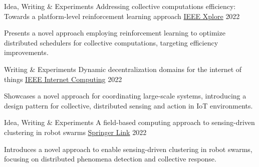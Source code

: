 \begin{cventries}
  \cventry
    {Idea, Writing \& Experiments}
    {Addressing collective computations efficiency: Towards a platform-level reinforcement learning approach} %
    {\href{https://doi.org/10.1109/ACSOS55765.2022.00019}{IEEE Xplore}} %
    {2022} %
    {
      \begin{cvitems} %
        \item {Presents a novel approach employing reinforcement learning to optimize distributed schedulers for collective computations, targeting efficiency improvements.}
      \end{cvitems}
    }

  \cventry
    {Writing \& Experiments}
    {Dynamic decentralization domains for the internet of things} %
    {\href{https://doi.org/10.1109/MIC.2022.3216753}{IEEE Internet Computing}} %
    {2022} %
    {
      \begin{cvitems} %
        \item {Showcases a novel approach for coordinating large-scale systems, introducing a design pattern for collective, distributed sensing and action in IoT environments.}
      \end{cvitems}
    }

  \cventry
    {Idea, Writing \& Experiments}
    {A field-based computing approach to sensing-driven clustering in robot swarms} %
    {\href{https://doi.org/10.1007/s11721-022-00215-y}{Springer Link}} %
    {2022} %
    {
      \begin{cvitems} %
        \item {Introduces a novel approach to enable sensing-driven clustering in robot swarms, focusing on distributed phenomena detection and collective response.}
      \end{cvitems}
    }
\end{cventries}
